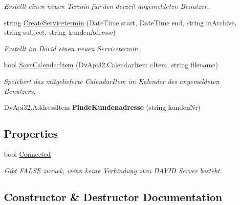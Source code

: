 \begin{DoxyCompactItemize}
\begin{DoxyCompactList}\small\item\em Erstellt einen neuen Termin für den derzeit angemeldeten Benutzer. \end{DoxyCompactList}\item 
string \hyperlink{class_david_1_1_david_service_acb83aa08ec8c9cb55db653a65a576aba}{Create\+Servicetermin} (Date\+Time start, Date\+Time end, string in\+Archive, string subject, string kunden\+Adresse)
\begin{DoxyCompactList}\small\item\em Erstellt im \hyperlink{namespace_david}{David} einen neuen Servicetermin. \end{DoxyCompactList}\item 
bool \hyperlink{class_david_1_1_david_service_a87660cc04c3ef0895c07e0ec92ac518b}{Save\+Calendar\+Item} (Dv\+Api32.\+Calendar\+Item c\+Item, string filename)
\begin{DoxyCompactList}\small\item\em Speichert das mitgelieferte Calendar\+Item im Kalender des angemeldeten Benutzers. \end{DoxyCompactList}\item 
Dv\+Api32.\+Address\+Item {\bfseries Finde\+Kundenadresse} (string kunden\+Nr)\hypertarget{class_david_1_1_david_service_a35f4c93828ce4d755b2c3988f5f78448}{}\label{class_david_1_1_david_service_a35f4c93828ce4d755b2c3988f5f78448}

\end{DoxyCompactItemize}
\subsection*{Properties}
\begin{DoxyCompactItemize}
\item 
bool \hyperlink{class_david_1_1_david_service_a3117ddeadc100eadc1fbf4a5f20998f3}{Connected}
\begin{DoxyCompactList}\small\item\em Gibt F\+A\+L\+SE zurück, wenn keine Verbindung zum D\+A\+V\+ID Server besteht. \end{DoxyCompactList}\end{DoxyCompactItemize}


\subsection{Constructor \& Destructor Documentation}
